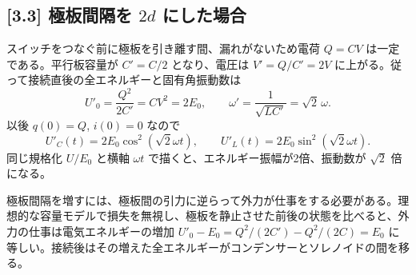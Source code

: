 \documentclass[11pt,a4paper]{article}
\begin{document}
\subsection*{[3.3] 極板間隔を $2d$ にした場合}
スイッチをつなぐ前に極板を引き離す間、漏れがないため電荷 $Q=CV$ は一定である。平行板容量が $C'=C/2$ となり、電圧は $V'=Q/C'=2V$ に上がる。従って接続直後の全エネルギーと固有角振動数は
\begin{equation}
 U'_0=\frac{Q^2}{2C'}=CV^2=2E_0,
 \qquad \omega'=\frac{1}{\sqrt{LC'}}=\sqrt2\,\omega.
\end{equation}
以後 $q(0)=Q$, $i(0)=0$ なので
\begin{equation}
 U'_C(t)=2E_0\cos^2(\sqrt2\omega t),\qquad
 U'_L(t)=2E_0\sin^2(\sqrt2\omega t).
\end{equation}
同じ規格化 $U/E_0$ と横軸 $\omega t$ で描くと、エネルギー振幅が2倍、振動数が $\sqrt2$ 倍になる。
\begin{center}
\end{center}
極板間隔を増すには、極板間の引力に逆らって外力が仕事をする必要がある。理想的な容量モデルで損失を無視し、極板を静止させた前後の状態を比べると、外力の仕事は電気エネルギーの増加 $U'_0-E_0=Q^2/(2C')-Q^2/(2C)=E_0$ に等しい。接続後はその増えた全エネルギーがコンデンサーとソレノイドの間を移る。
\end{document}
